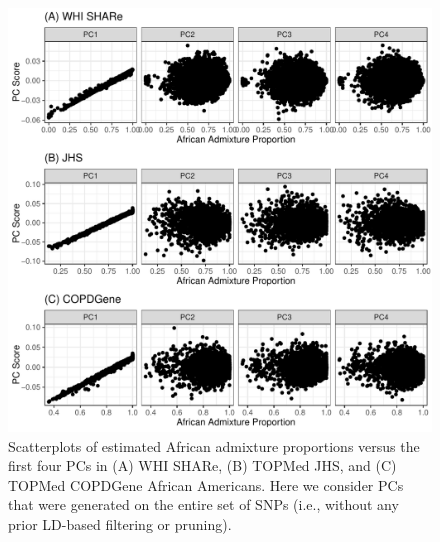 \documentclass[12pt]{article}
\begin{document}
\begin{figure}
\center
\includegraphics[width=\textwidth]{figs/finalfigs/figS1_pcs_vs_global}
\caption[Scatterplots of estimated admixture proportions versus the first four PCs, without LD-based filtering or pruning.]{Scatterplots of estimated African admixture proportions versus the first four PCs in (A) WHI SHARe, (B) TOPMed JHS, and (C) TOPMed COPDGene African Americans. Here we consider PCs that were generated on the entire set of SNPs (i.e., without any prior LD-based filtering or pruning).}
\label{fig:pcsvsglob}
\end{figure}
\end{document}
